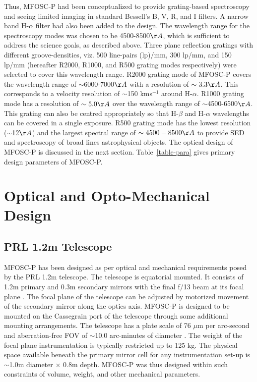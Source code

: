 \par  
Thus, MFOSC-P had been conceptualized to provide grating-based spectroscopy and seeing limited imaging in standard Bessell’s B, V, R, and I filters. A narrow band H-$\alpha$ filter had also been added to the design. The wavelength range for the spectroscopy modes was chosen to be 4500-8500$\AA$, which is sufficient to address the science goals, as described above. Three plane reflection gratings with different groove-densities, viz. 500 line-pairs (lp)/mm, 300 lp/mm, and 150 lp/mm (hereafter R2000, R1000, and R500 grating modes respectively) were selected to cover this wavelength range. R2000 grating mode of MFOSC-P covers the wavelength range of $\sim$6000-7000$\AA$ with a resolution of $\sim3.3\AA$. This corresponds to a velocity resolution of $\sim$150 kms$^{-1}$ around H-$\alpha$. R1000 grating mode has a resolution of $\sim5.0\AA$ over the wavelength range of $\sim$4500-6500$\AA$. This grating can also be centred appropriately so that H-$\beta$ and H-$\alpha$ wavelengths can be covered in a single exposure. R500 grating mode has the lowest resolution ($\sim$12$\AA$) and the largest spectral range of $\sim4500-8500\AA$ to provide SED and spectroscopy of broad lines astrophysical objects. The optical design of MFOSC-P is discussed in the next section. Table~\ref{table-para} gives primary design parameters of MFOSC-P.


\section{Optical and Opto-Mechanical Design}
\label{sec-DesignFull}

\par
\subsection{PRL 1.2m Telescope} 
\label{subsec-PRLTel}
\par 

MFOSC-P has been designed as per optical and mechanical requirements posed by the PRL 1.2m telescope. The telescope is equatorial mounted. It consists of 1.2m primary and 0.3m secondary mirrors with the final f/13 beam at its focal plane \citep{Deshpande1995}. The focal plane of the telescope can be adjusted by motorized movement of the secondary mirror along the optics axis. MFOSC-P is designed to be mounted on the Cassegrain port of the telescope through some additional mounting arrangements. The telescope has a plate scale of 76 $\mu$m per arc-second and aberration-free FOV of $\sim$10.0 arc-minutes of diameter \citep{Banerjee1997}. The weight of the focal plane instrumentation is typically restricted up to 125 kg. The physical space available beneath the primary mirror cell for any instrumentation set-up is $\sim$1.0m diameter $\times$ 0.8m depth. MFOSC-P was thus designed within such constraints of volume, weight, and other mechanical parameters.

